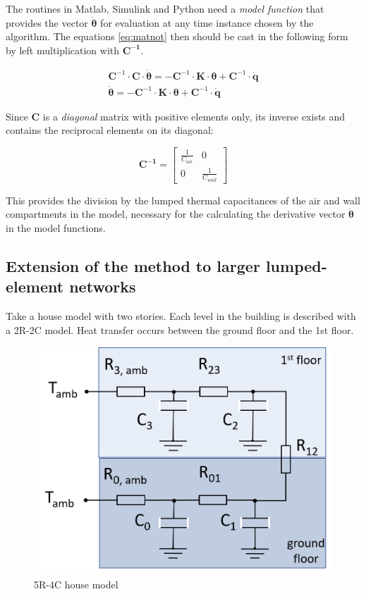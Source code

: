 The routines in Matlab, Simulink and Python need a \emph{model function} that provides the vector $\boldsymbol{\dot{\theta}}$ for evaluation at any time instance chosen by the algorithm. The equations \eqref{eq:matnot} then should be cast in the following form by left multiplication with $\mathbf{C^{-1}}$.

\begin{subequations}
	\label{eq:matnot_ivp}
	\begin{align}
		\mathbf{C}^{-1} \cdot \mathbf{C} \cdot \boldsymbol{\dot{\theta}} = - \mathbf{C}^{-1} \cdot \mathbf{K} \cdot \boldsymbol{\theta} + \mathbf{C}^{-1} \cdot \mathbf{\dot{q}} \\ 
        \boldsymbol{\dot{\theta}} = - \mathbf{C}^{-1} \cdot \mathbf{K} \cdot \boldsymbol{\theta} + \mathbf{C}^{-1} \cdot \mathbf{\dot{q}}
	\end{align}
\end{subequations}

Since $\mathbf{C}$ is a \emph{diagonal} matrix with positive elements only, its inverse exists and contains the reciprocal elements on its diagonal:

\begin{equation}
	\mathbf{C^{-1}} =
	\begin{bmatrix}
		\frac{1}{C_{air}} & 0 \\
		0 &  \frac{1}{C_{wall}}
	\end{bmatrix}
\end{equation}

This provides the division by the lumped thermal capacitances of the air and wall compartments in the model, necessary for the calculating the derivative vector $\boldsymbol{\dot{\theta}}$ in the model functions. 

\subsection{Extension of the method to larger lumped-element networks}

Take a house model with two stories. Each level in the building is described with a 2R-2C model. Heat transfer occurs between the ground floor and the 1st floor.

\begin{figure}[H]
	\centering
	\includegraphics[width=0.6\columnwidth]{Pictures/5R4C.png}
	\caption[Short title]{5R-4C house model}
	\label{fig:elec4R5C}
\end{figure}

